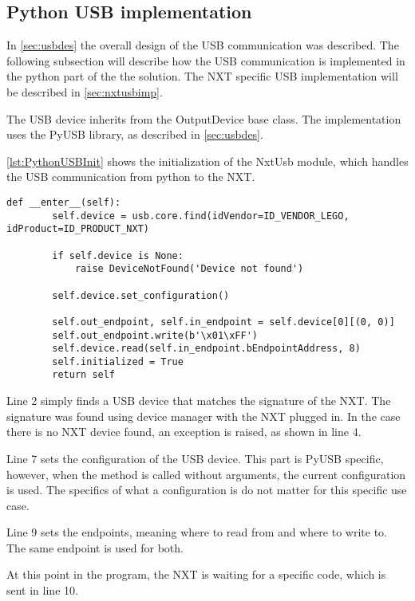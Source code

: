 \subsection{Python USB implementation}\label{sol:subsec:pythonusb}
In \autoref{sec:usbdes} the overall design of the USB communication was described.
The following subsection will describe how the USB communication is implemented in the python part of the the solution.
The NXT specific USB implementation will be described in \autoref{sec:nxtusbimp}.

The USB device inherits from the OutputDevice base class.
The implementation uses the PyUSB library, as described in \autoref{sec:usbdes}\cite{PyUSB}.

\autoref{lst:PythonUSBInit} shows the initialization of the NxtUsb module, which handles the USB communication from python to the NXT.
\begin{lstlisting}[label={lst:PythonUSBInit},caption={The initialization of PyUSB{.} Comments removed}]
    def __enter__(self):
        self.device = usb.core.find(idVendor=ID_VENDOR_LEGO, idProduct=ID_PRODUCT_NXT)

        if self.device is None:
            raise DeviceNotFound('Device not found')

        self.device.set_configuration()

        self.out_endpoint, self.in_endpoint = self.device[0][(0, 0)]
        self.out_endpoint.write(b'\x01\xFF') 
        self.device.read(self.in_endpoint.bEndpointAddress, 8) 
        self.initialized = True
        return self
\end{lstlisting}
Line 2 simply finds a USB device that matches the signature of the NXT.
The signature was found using device manager with the NXT plugged in.
In the case there is no NXT device found, an exception is raised, as shown in line 4.

Line 7 sets the configuration of the USB device.
This part is PyUSB specific, however, when the method is called without arguments, the current configuration is used.
The specifics of what a configuration is do not matter for this specific use case.

Line 9 sets the endpoints, meaning where to read from and where to write to.
The same endpoint is used for both.

At this point in the program, the NXT is waiting for a specific code, which is sent in line 10.

